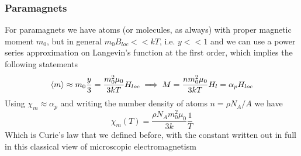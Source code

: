 \documentclass[../electromagnetism.tex]{subfiles}
\begin{document}
\subsubsection{Paramagnets}
For paramagnets we have atoms (or molecules, as always) with proper magnetic moment $m_0$, but in general $m_0B_{loc}<<kT$, i.e. $y<<1$ and we can use a power series approximation on Langevin's function at the first order, which implies the following statements
\begin{equation}
	\expval{m}\approx m_0\frac{y}{3}=\frac{m_0^2\mu_0}{3kT}H_{loc}\implies M=\frac{nm_0^2\mu_0}{3kT}H_l=\alpha_pH_{loc}
	\label{eq:langevinmagpara}
\end{equation}
Using $\chi_m\approx\alpha_p$ and writing the number density of atoms $n=\rho N_A/A$ we have
\begin{equation}
	\chi_m(T)=\frac{\rho N_Am_0^2\mu_0}{3k}\frac{1}{T}
	\label{eq:curielawnew}
\end{equation}
Which is Curie's law that we defined before, with the constant written out in full in this classical view of microscopic electromagnetism
\end{document}
